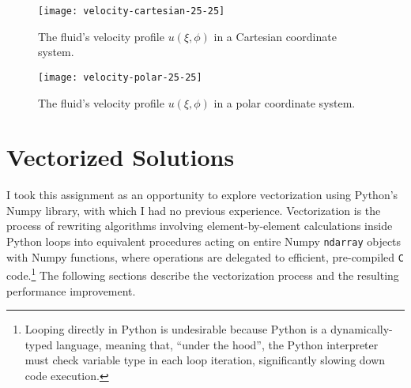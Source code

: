 \documentclass[11pt, a4paper]{article}
\begin{document}
\begin{figure}[H]
\centering
\texttt{[image: velocity-cartesian-25-25]}
\caption{The fluid's velocity profile $ u(\xi, \phi) $ in a Cartesian coordinate system.}
\label{gal:fig:u-cartesian}
\end{figure}

\begin{figure}[htb!]
\centering
\texttt{[image: velocity-polar-25-25]}
\caption{The fluid's velocity profile $ u(\xi, \phi) $ in a polar coordinate system.}
\label{gal:fig:u-polar}
\end{figure}



\section{Vectorized Solutions}
I took this assignment as an opportunity to explore vectorization using Python's Numpy library, with which I had no previous experience. Vectorization is the process of rewriting algorithms involving element-by-element calculations inside Python loops into equivalent procedures acting on entire Numpy \texttt{ndarray} objects with Numpy functions, where operations are delegated to efficient, pre-compiled \texttt{C} code.\footnote{Looping directly in Python is undesirable because Python is a dynamically-typed language, meaning that, ``under the hood'', the Python interpreter must check variable type in each loop iteration, significantly slowing down code execution.} The following sections describe the vectorization process and the resulting performance improvement.
\end{document}
